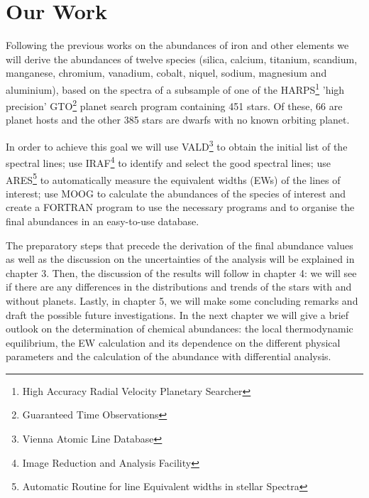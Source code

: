 \documentclass[dvips,12pt,a4paper]{report}
\begin{document}
{%

\section {Our Work}


Following the previous works on the abundances of iron and other elements we will derive the abundances of twelve species (silica, calcium, titanium, scandium, manganese, chromium, vanadium, cobalt, niquel, sodium, magnesium and aluminium), based on the spectra of a subsample of one of the HARPS\footnote{High Accuracy Radial Velocity Planetary Searcher} 'high precision' GTO\footnote{Guaranteed Time Observations} planet search program containing 451 stars. Of these, 66 are planet hosts and the other 385 stars are dwarfs with no known orbiting planet.

In order to achieve this goal we will use VALD\footnote{Vienna Atomic Line Database} to obtain the initial list of the spectral lines; use IRAF\footnote{Image Reduction and Analysis Facility} to identify and select the good spectral lines; use ARES\footnote{Automatic Routine for line Equivalent widths in stellar Spectra} to automatically measure the equivalent widths (EWs) of the lines of interest; use MOOG \citep{Sneden-1973} to calculate the abundances of the species of interest and create a FORTRAN program to use the necessary programs and to organise the final abundances in an easy-to-use database.

The preparatory steps that precede the derivation of the final abundance values as well as the discussion on the uncertainties of the analysis will be explained in chapter 3. Then, the discussion of the results will follow in chapter 4: we will see if there are any differences in the distributions and trends of the stars with and without planets. Lastly, in chapter 5, we will make some concluding remarks and draft the possible future investigations. In the next chapter we will give a brief outlook on the determination of chemical abundances: the local thermodynamic equilibrium, the EW calculation and its dependence on the different physical parameters and the calculation of the abundance with differential analysis.

}
\end{document}
